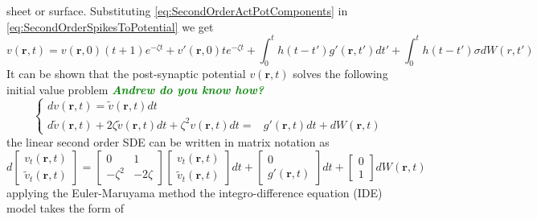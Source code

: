 \documentclass[a4paper,10pt]{article}
\newcommand{\parham}[1]{\textsf{\emph{\textbf{\textcolor{green}{#1}}}}}
\begin{document}
sheet or surface. Substituting \eqref{eq:SecondOrderActPotComponents} in
\eqref{eq:SecondOrderSpikesToPotential} we get
\begin{equation}\label{eq:SecondOrderNeuralModelDeterStoch}
v\left( {\mathbf{r},t} \right)=v(\mathbf r, 0)(t+1)e^{-\zeta t}+v'(\mathbf
r,0)te^{-\zeta t}+\int_0^t {h\left( {t - t'} \right)g'\left( {\mathbf{r},t'}
\right)dt'}+ \int_0^t h\left( {t - t'} \right)\sigma d W(r,t')
\end{equation}
It can be shown that the post-synaptic potential $v(\mathbf r, t)$ solves the
following initial value problem \parham{Andrew do you know how?}
\begin{equation*}\label{eq:SecondOrderInitialValueProblem}
\left\lbrace \begin{array}{lc}
dv(\mathbf r,t)=\tilde{v}(\mathbf r,t)dt & \\
d\tilde{v}(\mathbf r,t)+2\zeta\tilde{v}(\mathbf r,t)dt+\zeta^2v(\mathbf
r,t)dt=&g'(\mathbf r,t)dt+dW(\mathbf r,t)
\end{array}\right.
\end{equation*}
the linear second order SDE can be written in matrix notation as
\begin{equation}\label{eq:SecondOrderSDEMatrix}
 d\begin{bmatrix} v_t(\mathbf r ,t) \\ \tilde{v}_t(\mathbf r
,t)\end{bmatrix}=\begin{bmatrix}0 & 1 \\ -\zeta^2 & -2\zeta
\end{bmatrix}\begin{bmatrix} v_t(\mathbf r ,t) \\ \tilde{v}_t(\mathbf r
,t)\end{bmatrix}dt+\begin{bmatrix}0 \\ g'(\mathbf r,
t)\end{bmatrix}dt+\begin{bmatrix}0 \\ 1 \end{bmatrix}dW(\mathbf r,t)
\end{equation}
applying the Euler-Maruyama method the integro-difference equation (IDE) model
takes the form of
\end{document}
